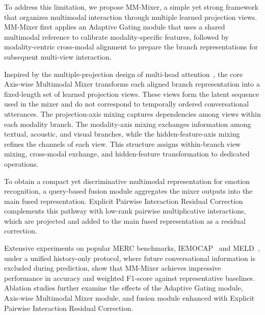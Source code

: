 \documentclass[letterpaper]{article} %
\begin{document}
To address this limitation, we propose MM-Mixer, a simple yet strong framework that organizes multimodal interaction through multiple learned projection views. MM-Mixer first applies an Adaptive Gating module that uses a shared multimodal reference to calibrate modality-specific features, followed by modality-centric cross-modal alignment to prepare the branch representations for subsequent multi-view interaction.

Inspired by the multiple-projection design of multi-head attention~\cite{vaswani2017attention}, the core Axis-wise Multimodal Mixer transforms each aligned branch representation into a fixed-length set of learned projection views. These views form the latent sequence used in the mixer and do not correspond to temporally ordered conversational utterances. The projection-axis mixing captures dependencies among views within each modality branch. The modality-axis mixing exchanges information among textual, acoustic, and visual branches, while the hidden-feature-axis mixing refines the channels of each view. This structure assigns within-branch view mixing, cross-modal exchange, and hidden-feature transformation to dedicated operations.

To obtain a compact yet discriminative multimodal representation for emotion recognition, a query-based fusion module aggregates the mixer outputs into the main fused representation. Explicit Pairwise Interaction Residual Correction complements this pathway with low-rank pairwise multiplicative interactions, which are projected and added to the main fused representation as a residual correction.

Extensive experiments on popular MERC benchmarks, IEMOCAP~\cite{iemocap} and MELD~\cite{meld}, under a unified history-only protocol, where future conversational information is excluded during prediction, show that MM-Mixer achieves impressive performance in accuracy and weighted F1-score against representative baselines. Ablation studies further examine the effects of the Adaptive Gating module, Axis-wise Multimodal Mixer module, and fusion module enhanced with Explicit Pairwise Interaction Residual Correction.

\end{document}
